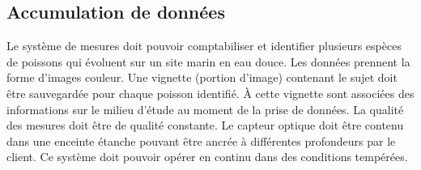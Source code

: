 

\subsection{Accumulation de données}
\label{s:beo_bes_accumdonnees}
Le système de mesures doit pouvoir comptabiliser et identifier plusieurs espèces de poissons qui évoluent sur un site marin en eau douce.
Les données prennent la forme d’images couleur. Une vignette (portion d’image) contenant le sujet doit être sauvegardée pour chaque poisson identifié.
À cette vignette sont associées des informations sur le milieu d’étude au moment de la prise de données.
La qualité des mesures doit être de qualité constante.
\wl
Le capteur optique doit être contenu dans une enceinte étanche pouvant être ancrée à différentes profondeurs par le client.
Ce système doit pouvoir opérer en continu dans des conditions tempérées.